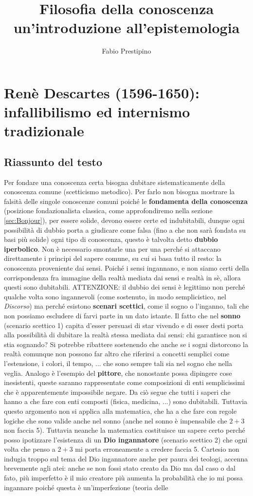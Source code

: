 \documentclass[10pt,a4paper]{article}
\author{Fabio Prestipino}
\title{Filosofia della conoscenza\\
		un'introduzione all'epistemologia}
\begin{document}
	\maketitle
	\newpage
	\tableofcontents
	\newpage
\section{Renè Descartes (1596-1650): infallibilismo ed internismo tradizionale}
\subsection{Riassunto del testo}
Per fondare una conoscenza certa bisogna dubitare sistematicamente della conoscenza comune (scetticismo metodico). Per farlo non bisogna mostrare la falsità delle singole conoscenze comuni poiché le \textbf{fondamenta della conoscenza} (posizione fondazionalista classica, come approfondiremo nella sezione \ref{sec:Bonjour}), per essere solide, devono essere certe ed indubitabili, dunque ogni possibilità di dubbio porta a giudicare come falsa (fino a che non sarà fondata su basi più solide) ogni tipo di conoscenza, questo è talvolta detto \textbf{dubbio iperbolico}. Non è necessario smontarle una per una perché si attaccano direttamente i principi del sapere comune, su cui si basa tutto il resto: la conoscenza proveniente dai sensi. Poiché i sensi ingannano, e non siamo certi della corrispondenza fra immagine della realtà mediata dai sensi e realtà in sè, allora questi sono dubitabili. ATTENZIONE: il dubbio dei sensi è legittimo non perché qualche volta sono ingannevoli (come sostenuto, in modo semplicistico, nel \textit{Discorso}) ma perché esistono \textbf{scenari scettici}, come il sogno o l'inganno, tali che non possiamo escludere di farvi parte in un dato istante. Il fatto che nel \textbf{sonno} (scenario scettico 1) capita d'esser persuasi di star vivendo e di esser desti porta alla possibilità di dubitare la realtà stessa mediata dai sensi: chi garantisce non si stia sognando? Si potrebbe ribattere sostenendo che anche se i sogni distorcono la realtà comunque non possono far altro che riferirsi a concetti semplici come l'estensione, i colori, il tempo, ... che sono sempre tali sia nel sogno che nella veglia. Analogo è l'esempio del \textbf{pittore}, che nonostante possa dipingere cose inesistenti, queste saranno rappresentate come composizioni di enti semplicissimi che è apparentemente impossibile negare. Da ciò segue che tutti i saperi che hanno a che fare con enti composti (fisica, medicina, ...) sono dubitabili. Tuttavia questo argomento non si applica alla matematica, che ha a che fare con regole logiche che sono valide anche nel sonno (anche nel sonno è impensabile che \(2 + 3\) non faccia 5). Tuttavia neanche la matematica costituisce un sapere certo perché posso ipotizzare l'esistenza di un \textbf{Dio ingannatore} (scenario scettico 2) che ogni volta che penso a \(2 + 3\) mi porta erroneamente a credere faccia 5. Cartesio non indugia troppo sul tema del Dio ingannatore anche per paura dei teologi, accenna brevemente agli atei: anche se non fossi stato creato da Dio ma dal caso o dal fato, più imperfetto è il mio creatore più aumenta la probabilità che io mi possa ingannare poiché questa è un'imperfezione (teoria delle 
\end{document}
